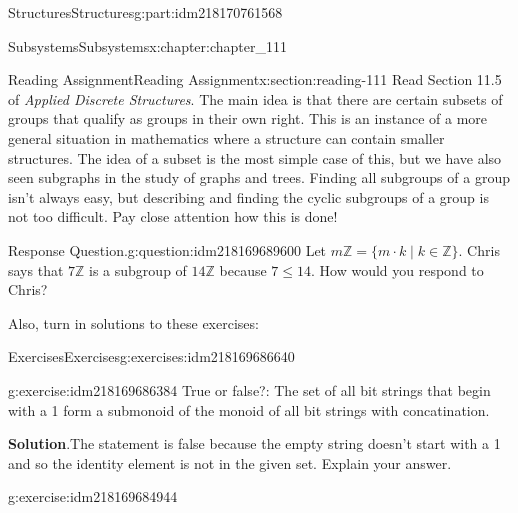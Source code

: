\documentclass[oneside,10pt,]{book}
\newcommand{\blocktitlefont}{\relax}
\numberwithin{equation}{section}
\begin{document}
\begin{partptx}{Structures}{}{Structures}{}{}{g:part:idm218170761568}
\typeout{************************************************}
%
\begin{chapterptx}{Subsystems}{}{Subsystems}{}{}{x:chapter:chapter_111}
%
%
%
%
%
\typeout{************************************************}
\typeout{************************************************}
%
\begin{sectionptx}{Reading Assignment}{}{Reading Assignment}{}{}{x:section:reading-111}
Read Section 11.5 of \emph{Applied Discrete Structures}. The main idea is that there are certain subsets of groups that qualify as groups in their own right.  This is an instance of a more general situation in mathematics where a structure can contain smaller structures.  The idea of a subset is the most simple case of this, but we have also seen subgraphs in the study of graphs and trees.  Finding all subgroups of a group isn't always easy, but describing and finding the cyclic subgroups of a group is not too difficult.  Pay close attention how this is done!%
\begin{question}{Response Question.}{g:question:idm218169689600}%
Let \(m \mathbb{Z} = \{m \cdot k \mid k \in \mathbb{Z}\}\). Chris says that \(7 \mathbb{Z}\) is a subgroup of \(14 \mathbb{Z}\) because \(7 \leq 14\).   How would you respond to Chris?%
\end{question}
Also, turn in solutions to these exercises:%
%
%
\typeout{************************************************}
\typeout{************************************************}
%
\begin{exercises-subsection-numberless}{Exercises}{}{Exercises}{}{}{g:exercises:idm218169686640}
\par\medskip\noindent%
%
\begin{exercisegroup}
\begin{divisionexerciseeg}{1}{}{}{g:exercise:idm218169686384}%
True or false?:  The set of all bit strings that begin with a 1 form a submonoid of the monoid of all bit strings with concatination.%
\par\smallskip%
\noindent\textbf{\blocktitlefont Solution}.\hypertarget{g:solution:idm218169685488}{}\quad{}The statement is false because the empty string doesn't start with a 1 and so the identity element is not in the given set. Explain your answer.%
\end{divisionexerciseeg}%
\begin{divisionexerciseeg}{2}{}{}{g:exercise:idm218169684944}%

\end{divisionexerciseeg}
\end{exercisegroup}
\end{exercises-subsection-numberless}
\end{sectionptx}
\end{chapterptx}
\end{partptx}
\end{document}
